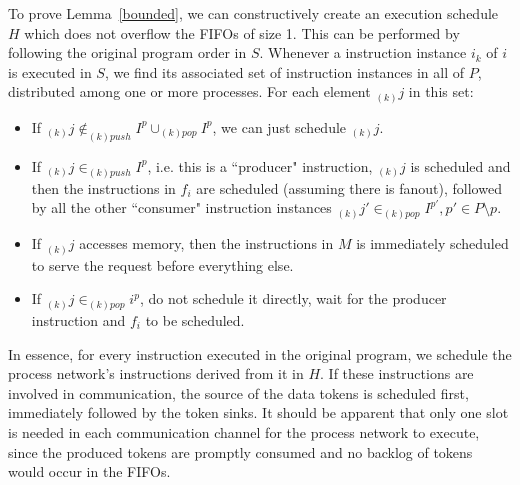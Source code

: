 To prove Lemma~\ref{bounded}, we can constructively create an execution schedule $H$
which does not overflow the FIFOs of size 1. This can be performed by following the original program order in $S$. 
Whenever a instruction instance $i_k$  of $i$ is executed in $S$, we find its associated set of instruction instances in all of $P$, distributed among one or more processes.
For each element $_{(k)}j$ 
in this set:
\begin{itemize}
    \item If $_{(k)}j \not\in _{(k)push}{I^p} \cup _{(k)pop}{I^p}$, we can just schedule $_{(k)}j$.
    \item If  $_{(k)}j \in _{(k)push}{I^p}$, i.e. this is a ``producer" instruction,
    $_{(k)}j$ is scheduled and then the instructions in $f_i$ are scheduled (assuming there is fanout), followed by all the other ``consumer" instruction instances $_{(k)}j' \in _{(k)pop}{I^{p'}}, p' \in P\setminus p$.
    
    

    \item If $_{(k)}j$ accesses memory, then the instructions in $M$ is immediately scheduled to serve the request before everything else.
    \item If $_{(k)}j \in _{(k)pop}{i^{p}}$, do not schedule it directly, wait for the producer instruction and $f_i$ to be scheduled.
\end{itemize}
In essence, for every instruction executed in the original program, we schedule the process network's instructions derived from it in $H$. If these instructions are involved in communication, the source of the data tokens is scheduled first, immediately followed by the token sinks. It should be apparent that only one slot is needed
in each communication channel for the process network to execute, since the produced tokens are promptly consumed and no backlog of tokens would occur in the FIFOs.


